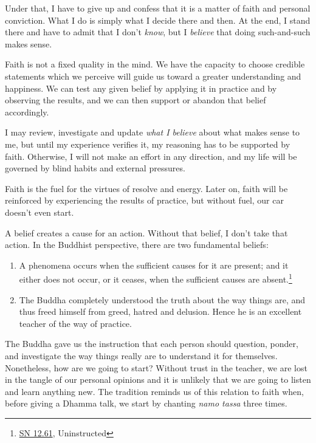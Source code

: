 Under that, I have to give up and confess that it is a matter of faith
and personal conviction. What I do is simply what I decide there and
then. At the end, I stand there and have to admit that I don't
\emph{know}, but I \emph{believe} that doing such-and-such makes sense.

Faith is not a fixed quality in the mind. We have the capacity to choose
credible statements which we perceive will guide us toward a greater
understanding and happiness. We can test any given belief by applying it
in practice and by observing the results, and we can then support or
abandon that belief accordingly.

I may review, investigate and update \emph{what I believe} about what
makes sense to me, but until my experience verifies it, my reasoning has
to be supported by faith. Otherwise, I will not make an effort in any
direction, and my life will be governed by blind habits and external
pressures.

Faith is the fuel for the virtues of resolve and energy. Later on, faith
will be reinforced by experiencing the results of practice, but without
fuel, our car doesn't even start.


A belief creates a cause for an action. Without that belief, I don't
take that action. In the Buddhist perspective, there are two fundamental
beliefs:

\begin{enumerate}
\item
  A phenomena occurs when the sufficient causes for it are present; and
  it either does not occur, or it ceases, when the sufficient causes are
  absent.\footnote{\href{https://www.dhammatalks.org/suttas/SN/SN12_61.html}{SN
    12.61}, Uninstructed}
\item
  The Buddha completely understood the truth about the way things are,
  and thus freed himself from greed, hatred and delusion. Hence he is an
  excellent teacher of the way of practice.
\end{enumerate}

The Buddha gave us the instruction that each person should question,
ponder, and investigate the way things really are to understand it for
themselves. Nonetheless, how are we going to start? Without trust in the
teacher, we are lost in the tangle of our personal opinions and it is
unlikely that we are going to listen and learn anything new. The
tradition reminds us of this relation to faith when, before giving a
Dhamma talk, we start by chanting \emph{namo tassa} three times.

